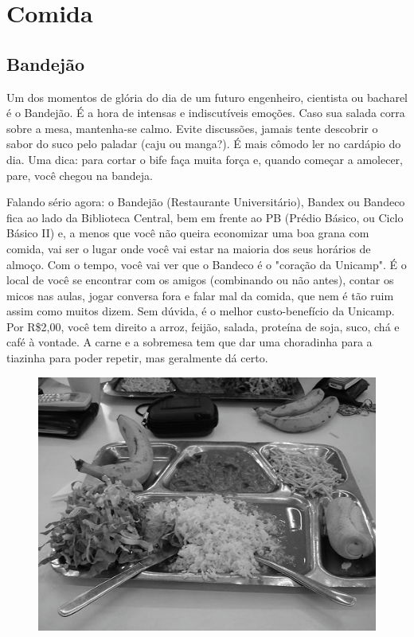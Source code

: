 
\section{Comida}
\subsection{Bandejão}

Um dos momentos de glória do dia de um futuro engenheiro, cientista ou bacharel
é o Bandejão. É a hora de intensas e indiscutíveis emoções. Caso sua salada
corra sobre a mesa, mantenha-se calmo. Evite discussões, jamais tente descobrir
o sabor do suco pelo paladar (caju ou manga?). É mais cômodo ler no cardápio
do dia. Uma dica: para cortar o bife faça muita força e, quando começar
a amolecer, pare, você chegou na bandeja.

Falando sério agora: o Bandejão (Restaurante Universitário), Bandex ou Bandeco
fica ao lado da Biblioteca Central, bem em frente ao PB (Prédio Básico, ou Ciclo
Básico II) e, a menos que você não queira economizar uma boa grana com comida,
vai ser o lugar onde você vai estar na maioria dos seus horários de almoço. Com
o tempo, você vai ver que o Bandeco é o "coração da Unicamp". É o local de você
se encontrar com os amigos (combinando ou não antes), contar os micos nas aulas,
jogar conversa fora e falar mal da comida, que nem é tão ruim assim como muitos
dizem. Sem dúvida, é o melhor custo-benefício da Unicamp. Por R\$2,00, você tem
direito a arroz, feijão, salada, proteína de soja, suco, chá e café à vontade.
A carne e a sobremesa tem que dar uma choradinha para a tiazinha para poder
repetir, mas geralmente dá certo.
\begin{figure}[h!]
    \centering
    \includegraphics[scale=0.58,keepaspectratio=true]{img/imgs/6-comida/-038.jpg}
\end{figure}


